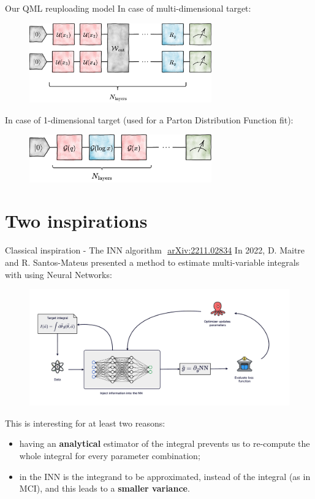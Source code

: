 \documentclass[8pt, xcolor={svgnames}, hyperref={linkcolor=black}]{beamer}
\begin{document}
\begin{frame}{Our QML reuploading model}
In case of multi-dimensional target:
\begin{figure}  
    \includegraphics[width=0.7\textwidth]{figures/4dim.png}
\end{figure}
In case of 1-dimensional target (used for a Parton Distribution Function fit):
\begin{figure}
    \includegraphics[width=0.7\textwidth]{figures/qpdf.png}
\end{figure}
\end{frame}

\section{Two inspirations}

\begin{frame}{Classical inspiration - The INN algorithm \hfill \faBook\,\,\href{https://arxiv.org/abs/2211.02834}{arXiv:2211.02834}}
In 2022, D. Maitre and R. Santos-Mateus presented a method to estimate multi-variable integrals with using 
Neural Networks:
\pause
\begin{figure}
    \includegraphics[width=1\textwidth]{figures/INN.pdf}
\end{figure}
\pause
This is interesting for at least two reasons:
\pause
\begin{itemize}
\item[\tiny\faSquare] having an \textbf{analytical} estimator of the integral prevents us 
to re-compute the whole integral for every parameter combination;
\pause
\item[\tiny\faSquare] in the INN is the integrand to be approximated, instead of 
the integral (as in MCI), and this leads to a \textbf{smaller variance}.
\end{itemize}
\end{frame}
\end{document}

